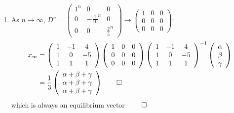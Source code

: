 \documentclass[12pt, a4paper]{article}
\begin{document}
\begin{enumerate}[Q\arabic*.]
\begin{enumerate}[(\alph*)]
      \item As $n\rightarrow\infty$, $D^n = \left(\begin{array}{ccc} 1^n & 0 & 0\\ 0 & -\frac{1}{10}^n & 0\\ 0 & 0 & \frac{2}{5}^n \end{array}\right) \rightarrow \left(\begin{array}{ccc} 1 & 0 & 0\\ 0 & 0 & 0\\ 0 & 0 & 0 \end{array}\right)$:
        \begin{align*}
          x_{\infty} &= \left(\begin{array}{ccc} 1 & -1 & 4\\ 1 & 0 & -5\\ 1 & 1 & 1 \end{array}\right)\left(\begin{array}{ccc} 1 & 0 & 0\\ 0 & 0 & 0\\ 0 & 0 & 0 \end{array}\right) \left(\begin{array}{ccc} 1 & -1 & 4\\ 1 & 0 & -5\\ 1 & 1 & 1 \end{array}\right)^{-1}\left(\begin{array}{c} \alpha\\ \beta\\ \gamma \end{array}\right)\\
              &= \frac{1}{3}\left(\begin{array}{c} \alpha + \beta + \gamma\\ \alpha + \beta + \gamma\\ \alpha + \beta + \gamma \end{array}\right) \qed
        \end{align*}
        which is always an equilibrium vector $\qed$
    \end{enumerate}


\end{enumerate}
\end{document}
